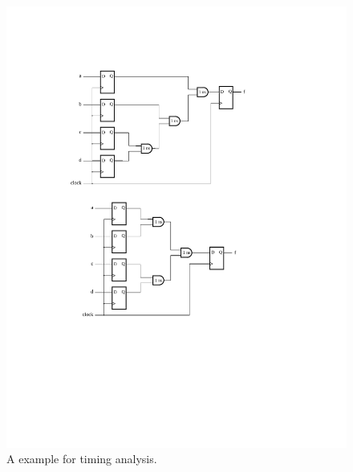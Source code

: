 \documentclass[11pt, twoside, pdftex]{article}
\begin{document}
\begin{figure}[H]
\begin{center}
\includegraphics[scale=.75]{figures/sample_circuit_unbalanced.pdf}
\end{center}
\caption{A example for timing analysis.}
\label{fig:fmax_computation_example}
\end{figure}
\end{document}
